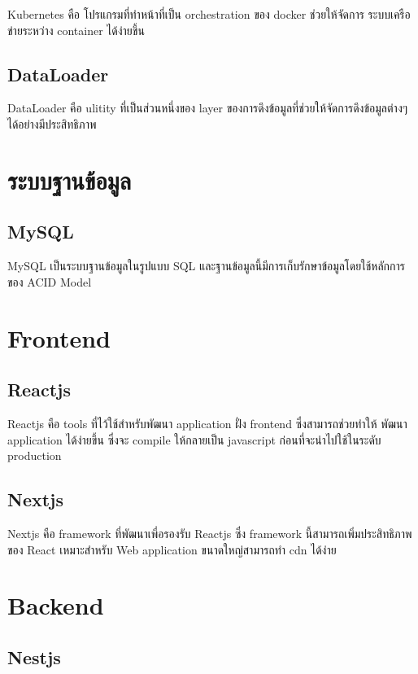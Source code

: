 Kubernetes \cite{kubernetes} คือ โปรแกรมที่ทำหน้าที่เป็น orchestration \cite  {orchestration} ของ docker ช่วยให้จัดการ ระบบเครือข่ายระหว่าง container ได้ง่ายขึ้น

\subsection{DataLoader}

DataLoader \cite{dataloader} คือ ulitity ที่เป็นส่วนหนึ่งของ layer ของการดึงข้อมูลที่ช่วยให้จัดการดึงข้อมูลต่างๆ ได้อย่างมีประสิทธิภาพ


\section{ระบบฐานข้อมูล}
\subsection{MySQL}

MySQL เป็นระบบฐานข้อมูลในรูปแบบ SQL และฐานข้อมูลนี้มีการเก็บรักษาข้อมูลโดยใช้หลักการของ ACID Model \cite{acid}

\section{Frontend}

\subsection{Reactjs}

Reactjs \cite{reactjs} คือ tools ที่ไว้ใช้สำหรับพัฒนา application ฝั่ง frontend ซึ่งสามารถช่วยทำให้ พัฒนา application ได้ง่ายขึ้น ซึ่งจะ compile ให้กลายเป็น javascript ก่อนที่จะนำไปใช้ในระดับ production

\subsection{Nextjs}

Nextjs \cite{nextjs} คือ framework \cite{framework} ที่พัฒนาเพี่อรองรับ Reactjs \cite{reactjs} ซึ่ง framework นี้สามารถเพิ่มประสิทธิภาพของ React \cite{reactjs} เหมาะสำหรับ Web application ขนาดใหญ่สามารถทำ cdn \cite{cdn} ได้ง่าย

\section{Backend}

\subsection{Nestjs}

